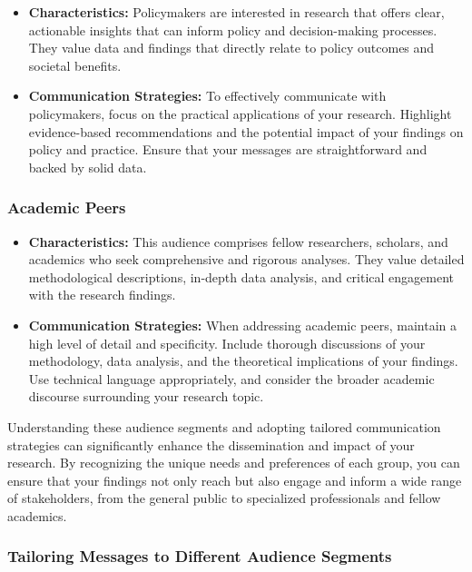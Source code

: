\documentclass[
]{book}
\providecommand{\tightlist}{%
  \setlength{\itemsep}{0pt}\setlength{\parskip}{0pt}}
\begin{document}
\begin{itemize}
\tightlist
\item
  \textbf{Characteristics:} Policymakers are interested in research that offers clear, actionable insights that can inform policy and decision-making processes. They value data and findings that directly relate to policy outcomes and societal benefits.
\item
  \textbf{Communication Strategies:} To effectively communicate with policymakers, focus on the practical applications of your research. Highlight evidence-based recommendations and the potential impact of your findings on policy and practice. Ensure that your messages are straightforward and backed by solid data.
\end{itemize}

\hypertarget{academic-peers}{%
\subsubsection*{Academic Peers}\label{academic-peers}}

\begin{itemize}
\tightlist
\item
  \textbf{Characteristics:} This audience comprises fellow researchers, scholars, and academics who seek comprehensive and rigorous analyses. They value detailed methodological descriptions, in-depth data analysis, and critical engagement with the research findings.
\item
  \textbf{Communication Strategies:} When addressing academic peers, maintain a high level of detail and specificity. Include thorough discussions of your methodology, data analysis, and the theoretical implications of your findings. Use technical language appropriately, and consider the broader academic discourse surrounding your research topic.
\end{itemize}

Understanding these audience segments and adopting tailored communication strategies can significantly enhance the dissemination and impact of your research. By recognizing the unique needs and preferences of each group, you can ensure that your findings not only reach but also engage and inform a wide range of stakeholders, from the general public to specialized professionals and fellow academics.

\hypertarget{tailoring-messages-to-different-audience-segments}{%
\subsubsection*{Tailoring Messages to Different Audience Segments}\label{tailoring-messages-to-different-audience-segments}}
\end{document}
